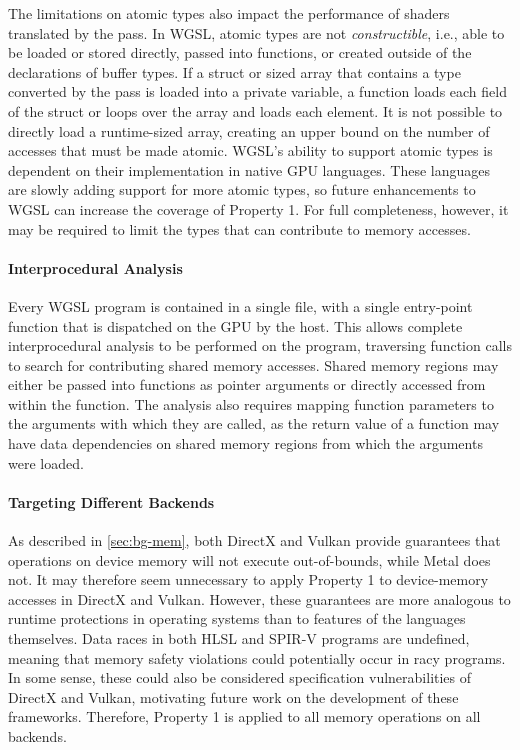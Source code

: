 The limitations on atomic types also impact the performance of shaders translated by the pass. In WGSL, atomic types are not \textit{constructible}, i.e., able to be loaded or stored directly, passed into functions, or created outside of the declarations of buffer types. If a struct or sized array that contains a type converted by the pass is loaded into a private variable, a function loads each field of the struct or loops over the array and loads each element. It is not possible to directly load a runtime-sized array, creating an upper bound on the number of accesses that must be made atomic. WGSL's ability to support atomic types is dependent on their implementation in native GPU languages. These languages are slowly adding support for more atomic types, so future enhancements to WGSL can increase the coverage of \smsg Property 1. For full completeness, however, it may be required to limit the types that can contribute to memory accesses.

\paragraph{Interprocedural Analysis} Every WGSL program is contained in a single file, with a single entry-point function that is dispatched on the GPU by the host. This allows complete interprocedural analysis to be performed on the program, traversing function calls to search for contributing shared memory accesses. Shared memory regions may either be passed into functions as pointer arguments or directly accessed from within the function. The analysis also requires mapping function parameters to the arguments with which they are called, as the return value of a function may have data dependencies on shared memory regions from which the arguments were loaded.

\paragraph{Targeting Different Backends}
As described in \mysec\ref{sec:bg-mem}, both DirectX and Vulkan provide guarantees that operations on device memory will not execute out-of-bounds, while Metal does not. It may therefore seem unnecessary to apply \smsg Property 1 to device-memory accesses in DirectX and Vulkan. However, these guarantees are more analogous to runtime protections in operating systems than to features of the languages themselves. Data races in both HLSL and SPIR-V programs are undefined, meaning that memory safety violations could potentially occur in racy programs. In some sense, these could also be considered specification vulnerabilities of DirectX and Vulkan, motivating future work on the development of these frameworks. Therefore, \smsg Property 1 is applied to all memory operations on all backends.

